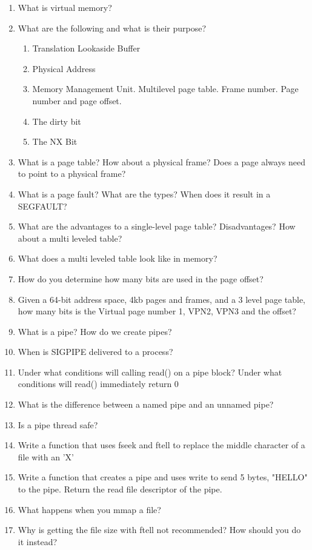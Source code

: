 \begin{enumerate}
\item What is virtual memory?
\item What are the following and what is their purpose?
  \begin{enumerate}
    \item Translation Lookaside Buffer
    \item Physical Address
    \item Memory Management Unit. Multilevel page table. Frame number. Page number and page offset.
    \item The dirty bit
    \item The NX Bit
  \end{enumerate}
\item What is a page table? How about a physical frame? Does a page always need to point to a physical frame?
\item What is a page fault? What are the types? When does it result in a SEGFAULT?
\item What are the advantages to a single-level page table? Disadvantages? How about a multi leveled table?
\item What does a multi leveled table look like in memory?
\item How do you determine how many bits are used in the page offset?
\item Given a 64-bit address space, 4kb pages and frames, and a 3 level page table, how many bits is the Virtual page number 1, VPN2, VPN3 and the offset?
\item What is a pipe? How do we create pipes?
\item When is SIGPIPE delivered to a process?
\item Under what conditions will calling read() on a pipe block? Under what conditions will read() immediately return 0
\item What is the difference between a named pipe and an unnamed pipe?
\item Is a pipe thread safe?
\item Write a function that uses fseek and ftell to replace the middle character of a file with an 'X'
\item Write a function that creates a pipe and uses write to send 5 bytes, "HELLO" to the pipe. Return the read file descriptor of the pipe.
\item What happens when you mmap a file?
\item Why is getting the file size with ftell not recommended? How should you do it instead?
\end{enumerate}



